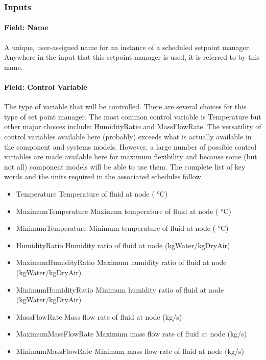 \subsubsection{Inputs}\label{inputs-043}

\paragraph{Field: Name}\label{field-name-042}

A unique, user-assigned name for an instance of a scheduled setpoint manager. Anywhere in the input that this setpoint manager is used, it is referred to by this name.

\paragraph{Field: Control Variable}\label{field-control-variable-000}

The type of variable that will be controlled. There are several choices for this type of set point manager. The most common control variable is Temperature but other major choices include: HumidityRatio and MassFlowRate. The versatility of control variables available here (probably) exceeds what is actually available in the component and systems models. However, a large number of possible control variables are made available here for maximum flexibility and because some (but not all) component models will be able to use them. The complete list of key words and the units required in the associated schedules follow.

\begin{itemize}
\item
  Temperature Temperature of fluid at node ( °C)
\item
  MaximumTemperature Maximum temperature of fluid at node ( °C)
\item
  MinimumTemperature Minimum temperature of fluid at node ( °C)
\item
  HumidityRatio Humidity ratio of fluid at node (kgWater/kgDryAir)
\item
  MaximumHumidityRatio Maximum humidity ratio of fluid at node (kgWater/kgDryAir)
\item
  MinimumHumidityRatio Minimum humidity ratio of fluid at node (kgWater/kgDryAir)
\item
  MassFlowRate Mass flow rate of fluid at node (kg/s)
\item
  MaximumMassFlowRate Maximum mass flow rate of fluid at node (kg/s)
\item
  MinimumMassFlowRate Minimum mass flow rate of fluid at node (kg/s)
\end{itemize}

